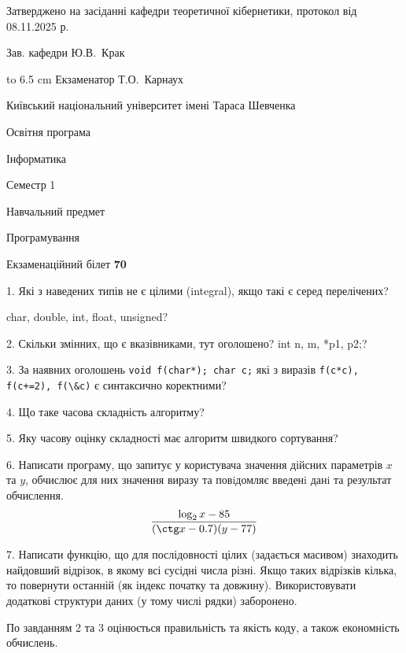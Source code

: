 \documentclass[12pt, ukrainian]{article}
\def\code#1{\Verb!#1!}
\begin{document}
{\smallskip\smallskip \begin {scriptsize} Затверджено на засіданні кафедри теоретичної кібернетики, протокол   від   08.11.2025 р.\par\smallskip\smallskip\smallskip\smallskip
{\parbox {6.5 cm} {Зав. кафедри \dotfill Ю.В.~Крак}}\hspace {0.7cm} {\hbox to 6.5 cm { Екзаменатор \dotfill Т.О.~Карнаух}} \end{scriptsize}}
\vspace{0.9cm}
{{\begin {scriptsize}\par
{ \center  Київський національний університет імені Тараса Шевченка \par}
{\parbox {5 cm}{Освітня програма \hfill}{\parbox {7 cm}{Інформатика\hfill}}\parbox {6 cm}{\hfill Семестр 1}}\par
{\parbox {5 cm} {Навчальний предмет \hfill}\parbox {7 cm}{Програмування \hfill}\parbox {6cm}{\hfill}\par}\vspace{-15pt} \end{scriptsize}}{\center Екзаменаційний білет \No \textbf { 70 }\par}}
{%
1. Які з наведених типів не є цілими (integral), якщо такі є серед перелічених?

char, double, int, float, unsigned?
\par
\vspace{2mm}
2. Скільки змінних, що є вказівниками, тут оголошено?
int n, m, *p1, p2;?
\par
\vspace{2mm}
3. За наявних оголошень \code{void f(char*); char c;} які з виразів \code{f(c*c), f(c+=2), f(\&c)} є синтаксично коректними?
\par
\vspace{2mm}
4. Що таке часова складність алгоритму?
\par
\vspace{2mm}
5. Яку часову оцінку складності має алгоритм швидкого сортування?
\par
\vspace{2mm}
6. Написати програму, що запитує у користувача значення дійсних параметрів $x$ та $y$, обчислює для них значення виразу та повiдомляє введенi данi та результат обчислення.
$$\frac{\log_{2} x - 85}{(\ctg x - 0.7) (y - 77)}$$ 

\par
7. Написати функцію, що для послідовності цілих (задається масивом) знаходить найдовший відрізок, в якому всі сусідні числа різні. Якщо таких відрізків кілька, то повернути останній (як індекс початку та довжину). Використовувати додаткові структури даних (у тому числі рядки) заборонено.

По завданням 2 та 3 оцінюється правильність та якість коду, а також економність обчислень.

}
\end{document}
